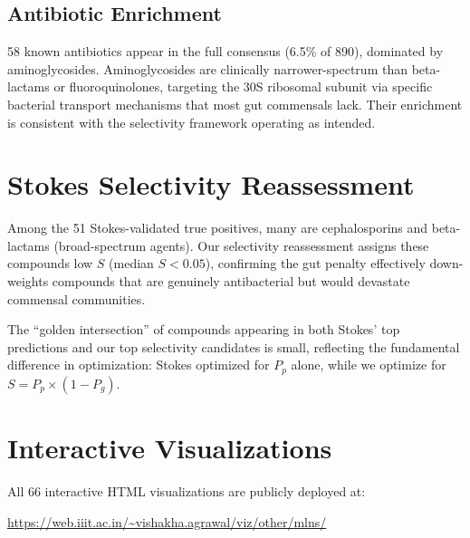 \documentclass{article}
\begin{document}
\subsection{Antibiotic Enrichment}

58 known antibiotics appear in the full consensus (6.5\% of 890), dominated by aminoglycosides.
Aminoglycosides are clinically narrower-spectrum than beta-lactams or fluoroquinolones, targeting the 30S ribosomal subunit via specific bacterial transport mechanisms that most gut commensals lack.
Their enrichment is consistent with the selectivity framework operating as intended.


\section{Stokes Selectivity Reassessment}
\label{app:stokes_reassess}

Among the 51 Stokes-validated true positives, many are cephalosporins and beta-lactams (broad-spectrum agents).
Our selectivity reassessment assigns these compounds low $S$ (median $S < 0.05$), confirming the gut penalty effectively down-weights compounds that are genuinely antibacterial but would devastate commensal communities.

The ``golden intersection'' of compounds appearing in both Stokes' top predictions and our top selectivity candidates is small, reflecting the fundamental difference in optimization: Stokes optimized for $P_p$ alone, while we optimize for $S = P_p \times (1 - P_g)$.


\section{Interactive Visualizations}
\label{app:viz}

All 66 interactive HTML visualizations are publicly deployed at:

\begin{center}
\small
\url{https://web.iiit.ac.in/~vishakha.agrawal/viz/other/mlns/}
\end{center}
\end{document}
